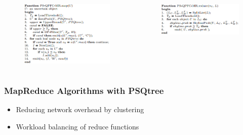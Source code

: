 \documentclass{beamer}
\begin{document}
\begin{frame}
\begin{columns}[t]
\begin{figure}[htpb]
  \begin{center}
	\includegraphics[width=\linewidth]{map.png}
  \end{center}
\end{figure}

\begin{figure}[htpb]
  \begin{center}
	\includegraphics[width=\linewidth]{reduce.png}
  \end{center}
\end{figure}
\end{columns}

\end{frame}

\begin{frame} 
\frametitle{MapReduce Algorithms with PSQtree}
\begin{itemize}
\item Reducing network overhead by clustering
\item Workload balancing of reduce functions
\end{itemize}
\end{frame}
\end{document}
